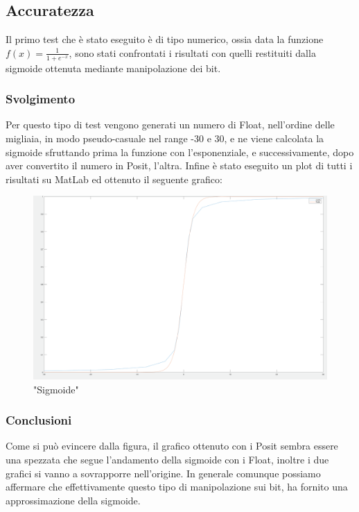 \documentclass[a4paper,11pt]{article}
\begin{document}
\subsection{Accuratezza}
Il primo test che è stato eseguito è di tipo numerico, ossia data la funzione  $ f(x) = \frac {1}{1 + e^{-x}} $, sono stati confrontati i risultati con quelli restituiti dalla sigmoide ottenuta mediante manipolazione dei bit.

\subsubsection{Svolgimento}

Per questo tipo di test vengono generati un numero di Float, nell'ordine delle migliaia, in modo pseudo-casuale nel range -30 e 30, e ne viene calcolata la sigmoide sfruttando prima la funzione con l'esponenziale, e successivamente, dopo aver convertito il numero in Posit, l'altra.
Infine è stato eseguito un plot di tutti i risultati su MatLab ed ottenuto il seguente grafico:

\begin{figure}[h]
	\includegraphics[scale=0.15]{sigmoide_2}
	\centering
	\caption{"Sigmoide"}
\end{figure}

\subsubsection{Conclusioni}
Come si può evincere dalla figura, il grafico ottenuto con i  Posit sembra essere una spezzata che segue l'andamento della sigmoide con i Float, inoltre i due grafici si vanno a sovrapporre nell'origine. In generale comunque possiamo affermare che effettivamente questo tipo di manipolazione sui bit, ha fornito una approssimazione della sigmoide.
\end{document}
